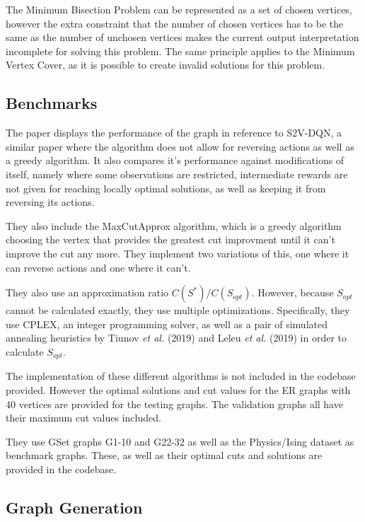 \documentclass{article}
\begin{document}
The Minimum Bisection Problem can be represented as a set of chosen vertices, however the extra constraint that the number of chosen vertices has to be the same as the number of unchosen vertices makes the current output interpretation incomplete for solving this problem. The same principle applies to the Minimum Vertex Cover, as it is possible to create invalid solutions for this problem. 

\subsection{Benchmarks}

The paper displays the performance of the graph in reference to S2V-DQN, a similar paper where the algorithm does not allow for reversing actions as well as a greedy algorithm. It also compares it's performance against modifications of itself, namely where some observations are restricted, intermediate rewards are not given for reaching locally optimal solutions, as well as keeping it from reversing its actions. 

They also include the MaxCutApprox algorithm, which is a greedy algorithm choosing the vertex that provides the greatest cut improvment until it can't improve the cut any more. They implement two variations of this, one where it can reverse actions and one where it can't. 

They also use an approximation ratio $C(S^*)/C(S_{opt})$. However, because $S_{opt}$ cannot be calculated exactly, they use multiple optimizations. Specifically, they use CPLEX, an integer programming solver, as well as a pair of simulated annealing heuristics by Tiunov \textit{et al.} (2019) and Leleu \textit{et al.} (2019) in order to calculate $S_{opt}$. 

The implementation of these different algorithms is not included in the codebase provided. However the optimal solutions and cut values for the ER graphs with 40 vertices are provided for the testing graphs. The validation graphs all have their maximum cut values included.

They use GSet graphs G1-10 and G22-32 as well as the Physics/Ising dataset as benchmark graphs. These, as well as their optimal cuts and solutions are provided in the codebase. 

\subsection{Graph Generation}
\end{document}
